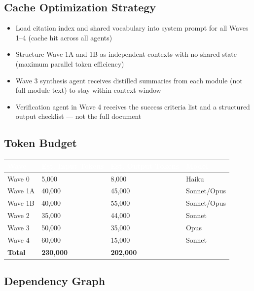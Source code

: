 \documentclass[11pt,letterpaper]{article}
\newcommand{\tableheader}[1]{\textbf{\sffamily\textcolor{white}{#1}}}
\begin{document}
\subsection{Cache Optimization Strategy}

\begin{itemize}[leftmargin=1.5em]
  \item Load citation index and shared vocabulary into system prompt for all Waves 1--4 (cache hit across all agents)
  \item Structure Wave 1A and 1B as independent contexts with no shared state (maximum parallel token efficiency)
  \item Wave 3 synthesis agent receives distilled summaries from each module (not full module text) to stay within context window
  \item Verification agent in Wave 4 receives the success criteria list and a structured output checklist --- not the full document
\end{itemize}

\subsection{Token Budget}

\begin{center}
\begin{tabularx}{\textwidth}{L{3cm}C{2.5cm}C{2.5cm}C{3cm}}
\toprule
{}
\tableheader{Wave} & \tableheader{Est. Input Tokens} & \tableheader{Est. Output Tokens} & \tableheader{Model} \\
\midrule
Wave 0 & 5,000 & 8,000 & Haiku \\
Wave 1A & 40,000 & 45,000 & Sonnet/Opus \\
Wave 1B & 40,000 & 55,000 & Sonnet/Opus \\
Wave 2 & 35,000 & 44,000 & Sonnet \\
Wave 3 & 50,000 & 35,000 & Opus \\
Wave 4 & 60,000 & 15,000 & Sonnet \\
\midrule
\textbf{Total} & \textbf{230,000} & \textbf{202,000} & \\
\bottomrule
\end{tabularx}
\end{center}

\subsection{Dependency Graph}
\end{document}
